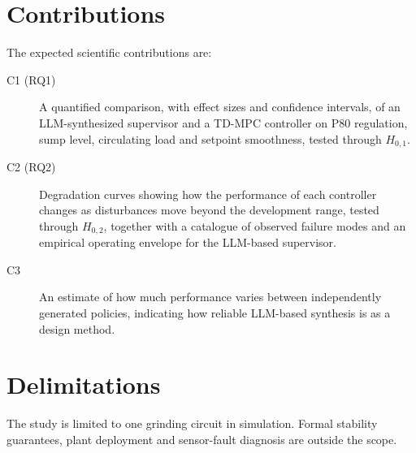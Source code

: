 \section{Contributions}
The expected scientific contributions are:
\begin{description}
\item[C1 (RQ1)] A quantified comparison, with effect sizes and confidence
  intervals, of an LLM-synthesized supervisor and a TD-MPC controller on P80
  regulation, sump level, circulating load and setpoint smoothness, tested
  through $H_{0,1}$.
\item[C2 (RQ2)] Degradation curves showing how the performance of each
  controller changes as disturbances move beyond the development range,
  tested through $H_{0,2}$, together with a catalogue of observed failure
  modes and an empirical operating envelope for the LLM-based supervisor.
\item[C3] An estimate of how much performance varies between independently
  generated policies, indicating how reliable LLM-based synthesis is as a
  design method.
\end{description}

\section{Delimitations}
\label{sec:delimitations}
The study is limited to one grinding circuit in simulation. Formal stability
guarantees, plant deployment and sensor-fault diagnosis are outside the
scope.

